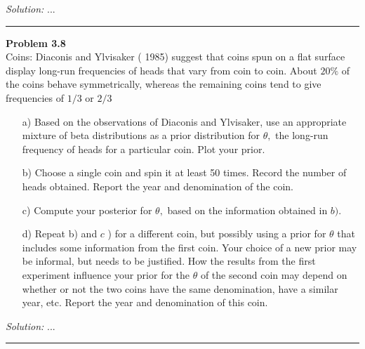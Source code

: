 \documentclass[a4paper, 11pt]{article}
\newenvironment{problem}[2][Problem]
    { \begin{mdframed}[backgroundcolor=gray!20] \textbf{#1 #2} \\}
    {  \end{mdframed}}
\newenvironment{solution}
    {\textit{Solution:}}
    {}
\begin{document}
\begin{solution}
...	
\end{solution} 

\noindent\rule{7in}{2.8pt}

\begin{problem}{3.8}
Coins: Diaconis and Ylvisaker ( 1985) suggest that coins spun on a flat surface display long-run frequencies of heads that vary from coin to coin. About $20 \%$ of the coins behave symmetrically, whereas the remaining coins tend to give frequencies of $1 / 3$ or $2 / 3$

\begin{enumerate}[leftmargin=*, parsep=0pt,itemsep=0pt, topsep=0pt]
	\item [a)] Based on the observations of Diaconis and Ylvisaker, use an appropriate mixture of beta distributions as a prior distribution for $\theta,$ the long-run frequency of heads for a particular coin. Plot your prior.
	\item[b)] Choose a single coin and spin it at least 50 times. Record the number of heads obtained. Report the year and denomination of the coin.
	\item[c)] Compute your posterior for $\theta,$ based on the information obtained in $b)$.
	\item[d)] Repeat b) and $c$ ) for a different coin, but possibly using a prior for $\theta$ that includes some information from the first coin. Your choice of a new prior may be informal, but needs to be justified. How the results from the first experiment influence your prior for the $\theta$ of the second coin may depend on whether or not the two coins have the same denomination, have a similar year, etc. Report the year and denomination of this coin.
\end{enumerate}

\end{problem}
\begin{solution}
...
\end{solution} 

\noindent\rule{7in}{2.8pt}

\end{document}
